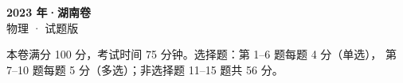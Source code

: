 \documentclass[zihao=-4, a4paper]{ctexart}
\begin{document}
\begin{center}
  {\Large\bfseries 2023 年·湖南卷}\\[4pt]
  {\large 物理 · 试题版}
\end{center}
\medskip
\begin{gknotice}
  本卷满分 100 分，考试时间 75 分钟。选择题：第 1--6 题每题 4 分（单选），
  第 7--10 题每题 5 分（多选）；非选择题 11--15 题共 56 分。
\end{gknotice}

\end{document}

